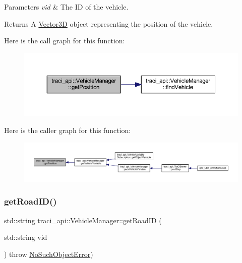 \begin{DoxyParams}{Parameters}
{\em vid} & The ID of the vehicle. \\
\hline
\end{DoxyParams}
\begin{DoxyReturn}{Returns}
A \hyperlink{class_vector3_d}{Vector3D} object representing the position of the vehicle. 
\end{DoxyReturn}
Here is the call graph for this function\+:
\nopagebreak
\begin{figure}[H]
\begin{center}
\leavevmode
\includegraphics[width=350pt]{classtraci__api_1_1_vehicle_manager_ad00a8d49736c7806f0d363d641b7f467_cgraph}
\end{center}
\end{figure}
Here is the caller graph for this function\+:
\nopagebreak
\begin{figure}[H]
\begin{center}
\leavevmode
\includegraphics[width=350pt]{classtraci__api_1_1_vehicle_manager_ad00a8d49736c7806f0d363d641b7f467_icgraph}
\end{center}
\end{figure}
\mbox{\label{classtraci__api_1_1_vehicle_manager_a3cbdffab3f5fd337a6de08a14b87803e}} 
\subsubsection{\texorpdfstring{get\+Road\+I\+D()}{getRoadID()}}
{\footnotesize\ttfamily std\+::string traci\+\_\+api\+::\+Vehicle\+Manager\+::get\+Road\+ID (\begin{DoxyParamCaption}\item[{std\+::string}]{vid }\end{DoxyParamCaption}) throw  \hyperlink{classtraci__api_1_1_no_such_object_error}{No\+Such\+Object\+Error}) }

